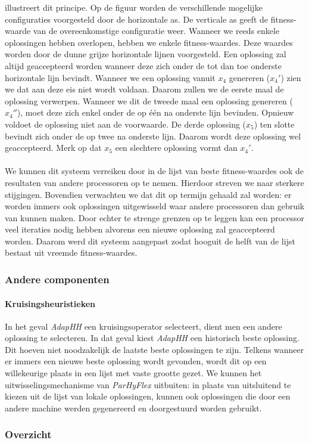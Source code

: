 
 illustreert dit principe. Op de figuur worden de verschillende mogelijke configuraties voorgesteld door de horizontale as. De verticale as geeft de fitness-waarde van de overeenkomstige configuratie weer. Wanneer we reeds enkele oplossingen hebben overlopen, hebben we enkele fitness-waardes. Deze waardes worden door de dunne grijze horizontale lijnen voorgesteld. Een oplossing zal altijd geaccepteerd worden wanneer deze zich onder de tot dan toe onderste horizontale lijn bevindt. Wanneer we een oplossing vanuit $x_4$ genereren ($x_4'$) zien we dat aan deze eis niet wordt voldaan. Daarom zullen we de eerste maal de oplossing verwerpen. Wanneer we dit de tweede maal een oplossing genereren ($x_4''$), moet deze zich enkel onder de op \'e\'en na onderste lijn bevinden. Opnieuw voldoet de oplossing niet aan de voorwaarde. De derde oplossing ($x_5$) ten slotte bevindt zich onder de op twee na onderste lijn. Daarom wordt deze oplossing wel geaccepteerd. Merk op dat $x_5$ een slechtere oplossing vormt dan $x_4'$.

\paragraph{}
We kunnen dit systeem verreiken door in de lijst van beste fitness-waardes ook de resultaten van andere processoren op te nemen. Hierdoor streven we naar sterkere stijgingen. Bovendien verwachten we dat dit op termijn gehaald zal worden: er worden immers ook oplossingen uitgewisseld waar andere processoren dan gebruik van kunnen maken. Door echter te strenge grenzen op te leggen kan een processor veel iteraties nodig hebben alvorens een nieuwe oplossing zal geaccepteerd worden. Daarom werd dit systeem aangepast zodat hooguit de helft van de lijst bestaat uit vreemde fitness-waardes.

\subsubsection{Andere componenten}

\paragraph{Kruisingsheuristieken}
In het geval \emph{AdapHH} een kruisingsoperator selecteert, dient men een andere oplossing te selecteren. In dat geval kiest \emph{AdapHH} een historisch beste oplossing. Dit hoeven niet noodzakelijk de laatste beste oplossingen te zijn. Telkens wanneer er immers een nieuwe beste oplossing wordt gevonden, wordt dit op een willekeurige plaats in een lijst met vaste grootte gezet. We kunnen het uitwisselingsmechanisme van \emph{ParHyFlex} uitbuiten: in plaats van uitsluitend te kiezen uit de lijst van lokale oplossingen, kunnen ook oplossingen die door een andere machine werden gegenereerd en doorgestuurd worden gebruikt.

\subsubsection{Overzicht}

